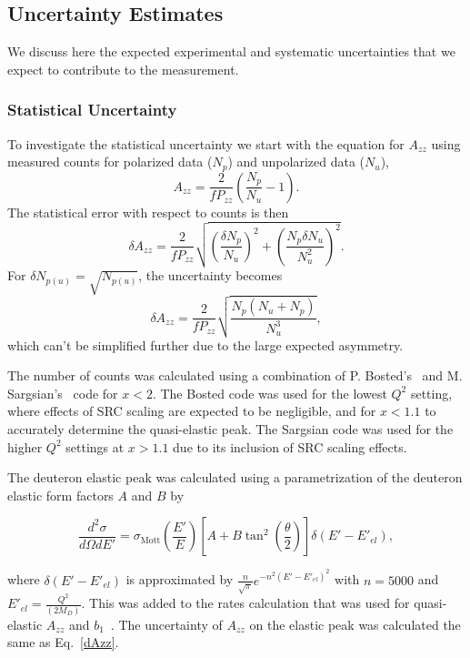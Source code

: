 \subsection{Uncertainty Estimates}
\label{uncertainties}
We discuss here the expected experimental and systematic uncertainties that we expect to contribute to the measurement.

\subsubsection{Statistical Uncertainty}
\label{stat}
To investigate the statistical uncertainty we start with the equation for $A_{zz}$ using
measured counts for polarized data ($N_p$) and unpolarized data ($N_u$), 
\begin{equation}
A_{zz}=\frac{2}{fP_{zz}}\left(\frac{N_p}{N_u}-1\right).
\end{equation}
The statistical error with respect to counts is then
\begin{equation}
\delta A_{zz}=\frac{2}{fP_{zz}}\sqrt{\left(\frac{\delta N_p}{N_u}\right)^2+\left(\frac{N_p\delta N_u}{N_u^2}\right)^2}.
\end{equation}
For $\delta N_{p(u)}=\sqrt{N_{p(u)}}$, the uncertainty becomes
\begin{equation}
\label{dAzz}
\delta A_{zz}=\frac{2}{fP_{zz}}\sqrt{\frac{N_p(N_u + N_p)}{N_u^3}},
\end{equation}
which can't be simplified further due to the large expected asymmetry.

The number of counts was calculated using a combination of P. Bosted's~\cite{Bosted:2012qc} and M. Sargsian's~\cite{misak-convo} code for $x<2$. The Bosted code was used for the lowest $Q^2$ setting, where effects of SRC scaling are expected to be negligible, and for $x<1.1$ to accurately determine the quasi-elastic peak. The Sargsian code was used for the higher $Q^2$ settings at $x>1.1$ due to its inclusion of SRC scaling effects.

The deuteron elastic peak was calculated using a parametrization of the deuteron elastic form factors $A$ and $B$ by

\begin{equation}
\frac{d^2 \sigma}{d\Omega dE'} = \sigma_{\mathrm{Mott}}\left(\frac{E'}{E}\right)\left[ A + B \tan ^2 \left( \frac{\theta}{2} \right) \right] \delta (E'-E'_{el}),
\end{equation}

where $\delta(E'-E'_{el})$ is approximated by $\frac{n}{\sqrt{\pi}}e^{-n^2 (E'-E'_{el})^2}$ with $n=5000$ and $E'_{el}=\frac{Q^2}{(2M_D)}.$ This was added to the rates calculation that was used for quasi-elastic $A_{zz}$ and $b_1$~\cite{Long:2013tn}. The uncertainty of $A_{zz}$ on the elastic peak was calculated the same as Eq.~\ref{dAzz}.

